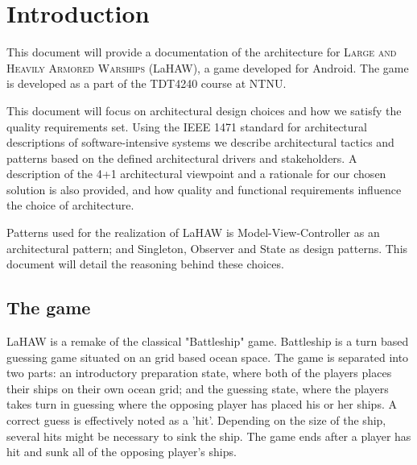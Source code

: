 \chapter{Introduction}
This document will provide a documentation of the architecture for \textsc{Large and Heavily Armored Warships} (LaHAW), a game developed for Android. The game is developed as a part of the TDT4240 course at NTNU.

This document will focus on architectural design choices and how we satisfy the quality requirements set. Using the IEEE 1471 standard for architectural descriptions of software-intensive systems\cite{IEEE1471} we describe architectural tactics and patterns based on the defined architectural drivers and stakeholders. A description of the 4+1 architectural viewpoint\cite{4+1} and a rationale for our chosen solution is also provided, and how quality and functional requirements influence the choice of architecture.

Patterns used for the realization of LaHAW is Model-View-Controller as an architectural pattern; and Singleton, Observer and State as design patterns. This document will detail the reasoning behind these choices.

	\section{The game}
	LaHAW is a remake of the classical "Battleship" game\cite{battleship}. Battleship is a turn based guessing game situated on an grid based ocean space. The game is separated into two parts: an introductory preparation state, where both of the players places their ships on their own ocean grid; and the guessing state, where the players takes turn in guessing where the opposing player has placed his or her ships. A correct guess is effectively noted as a 'hit'. Depending on the size of the ship, several hits might be necessary to sink the ship. The game ends after a player has hit and sunk all of the opposing player's ships.